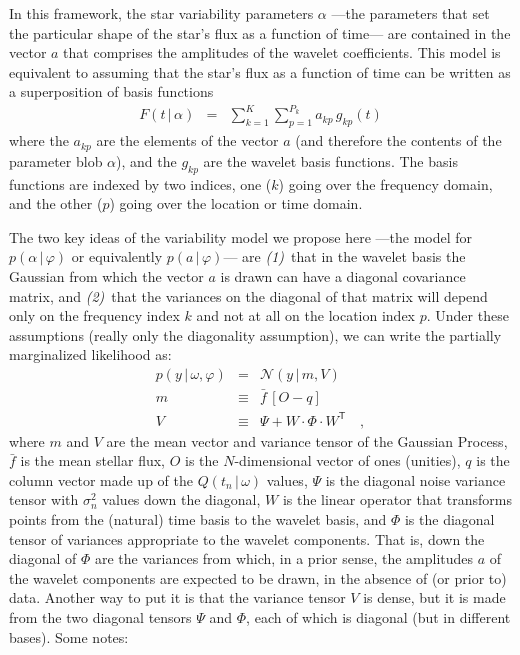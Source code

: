 \documentclass[12pt,letterpaper]{article}
\newcommand{\given}{\,|\,}
\newcommand{\transpose}[1]{{#1}^{\mathsf{T}}}
\newcommand{\datavec}{y}
\newcommand{\exofn}{Q}
\newcommand{\exovec}{q}
\newcommand{\exopars}{\omega}
\newcommand{\flux}{F}
\newcommand{\meanflux}{\bar{f}}
\newcommand{\lcpars}{\alpha}
\newcommand{\variance}{\sigma^2}
\newcommand{\hyperpars}{\varphi}
\newcommand{\normal}{{\mathcal N}}
\newcommand{\meanvec}{m}
\newcommand{\wavevec}{a}
\newcommand{\noisetensor}{\Psi}
\newcommand{\wavetensor}{\Phi}
\newcommand{\weightmatrix}{W}
\newcommand{\vartensor}{V}
\newcommand{\basisfunction}{g}
\newcommand{\onevec}{O}
\begin{document}
In this framework, the star variability parameters $\lcpars$%
---the parameters that set the particular shape of the star's flux as a function of time---%
are contained in the vector $\wavevec$ that comprises the amplitudes of the wavelet coefficients.
This model is equivalent to assuming that the star's flux as a function of time
can be written as a superposition of basis functions
\begin{eqnarray}
\flux(t\given\lcpars) &=& \sum_{k=1}^K \sum_{p=1}^{P_k} \wavevec_{kp}\,\basisfunction_{kp}(t)
\end{eqnarray}
where
the $\wavevec_{kp}$ are the elements of the vector $\wavevec$
(and therefore the contents of the parameter blob $\lcpars$),
and the $\basisfunction_{kp}$ are the wavelet basis functions.
The basis functions are indexed by two indices,
one ($k$) going over the frequency domain,
and the other ($p$) going over the location or time domain.

The two key ideas of the variability model we propose here%
---the model for $p(\lcpars\given\hyperpars)$ or equivalently $p(\wavevec\given\hyperpars)$---%
are \textsl{(1)}~that in the wavelet basis the Gaussian from which the vector $\wavevec$ is drawn
can have a diagonal covariance matrix,
and \textsl{(2)}~that the variances on the diagonal of that matrix will depend only on the
frequency index $k$ and not at all on the location index $p$.
Under these assumptions (really only the diagonality assumption),
we can write the partially marginalized likelihood as:
\begin{eqnarray}
p(\datavec\given\exopars,\hyperpars)
  &=& \normal(\datavec\given\meanvec,\vartensor)
\label{eq:wavelike}
\\
\meanvec
  &\equiv& \meanflux\,[\onevec - \exovec]
\\
\vartensor
  &\equiv& \noisetensor + \weightmatrix\cdot\wavetensor\cdot\transpose{\weightmatrix}
\label{eq:variance}
\quad ,
\end{eqnarray}
where
$\meanvec$ and $\vartensor$ are the mean vector and variance tensor of the Gaussian Process,
$\meanflux$ is the mean stellar flux,
$\onevec$ is the $N$-dimensional vector of ones (unities),
$\exovec$ is the column vector made up of the $\exofn(t_n\given\exopars)$ values,
$\noisetensor$ is the diagonal noise variance tensor with $\variance_n$ values down the diagonal,
$\weightmatrix$ is the linear operator that transforms points
from the (natural) time basis to the wavelet basis,
and $\wavetensor$ is the diagonal tensor of variances appropriate to the wavelet components.
That is, down the diagonal of $\wavetensor$ are the variances from which,
in a prior sense,
the amplitudes $\wavevec$ of the wavelet components are expected to be drawn,
in the absence of (or prior to) data.
Another way to put it is that the variance tensor $\vartensor$ is dense,
but it is made from the two diagonal tensors $\noisetensor$ and $\wavetensor$,
each of which is diagonal (but in different bases).  Some notes:
\end{document}
